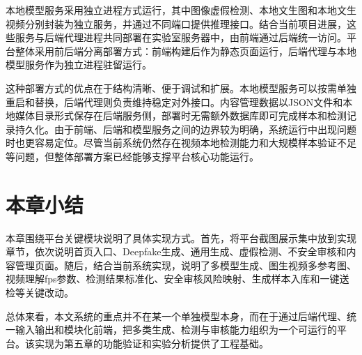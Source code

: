 本地模型服务采用独立进程方式运行，其中图像虚假检测、本地文生图和本地文生视频分别封装为独立服务，并通过不同端口提供推理接口。结合当前项目进展，这些服务与后端代理进程共同部署在实验室服务器中，由前端通过后端统一访问。平台整体采用前后端分离部署方式：前端构建后作为静态页面运行，后端代理与本地模型服务作为独立进程驻留运行。

这种部署方式的优点在于结构清晰、便于调试和扩展。本地模型服务可以按需单独重启和替换，后端代理则负责维持稳定对外接口。内容管理数据以JSON文件和本地媒体目录形式保存在后端服务侧，部署时无需额外数据库即可完成样本和检测记录持久化。由于前端、后端和模型服务之间的边界较为明确，系统运行中出现问题时也更容易定位。尽管当前系统仍然存在视频本地检测能力和大规模样本验证不足等问题，但整体部署方案已经能够支撑平台核心功能运行。

\section{本章小结}

本章围绕平台关键模块说明了具体实现方式。首先，将平台截图展示集中放到实现章节，依次说明首页入口、Deepfake生成、通用生成、虚假检测、不安全审核和内容管理页面。随后，结合当前系统实现，说明了多模型生成、图生视频多参考图、视频理解fps参数、检测结果标准化、安全审核风险映射、生成样本入库和一键送检等关键改动。

总体来看，本文系统的重点并不在某一个单独模型本身，而在于通过后端代理、统一输入输出和模块化前端，把多类生成、检测与审核能力组织为一个可运行的平台。该实现为第五章的功能验证和实验分析提供了工程基础。
